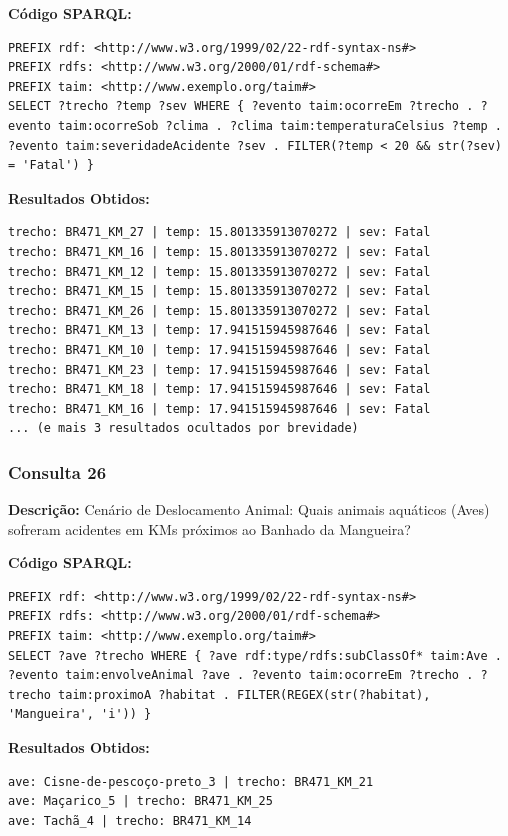\documentclass[12pt,a4paper]{article}
\begin{document}
\textbf{Código SPARQL:}
\begin{lstlisting}
PREFIX rdf: <http://www.w3.org/1999/02/22-rdf-syntax-ns#>
PREFIX rdfs: <http://www.w3.org/2000/01/rdf-schema#>
PREFIX taim: <http://www.exemplo.org/taim#>
SELECT ?trecho ?temp ?sev WHERE { ?evento taim:ocorreEm ?trecho . ?evento taim:ocorreSob ?clima . ?clima taim:temperaturaCelsius ?temp . ?evento taim:severidadeAcidente ?sev . FILTER(?temp < 20 && str(?sev) = 'Fatal') }
\end{lstlisting}

\textbf{Resultados Obtidos:}
\begin{lstlisting}
trecho: BR471_KM_27 | temp: 15.801335913070272 | sev: Fatal
trecho: BR471_KM_16 | temp: 15.801335913070272 | sev: Fatal
trecho: BR471_KM_12 | temp: 15.801335913070272 | sev: Fatal
trecho: BR471_KM_15 | temp: 15.801335913070272 | sev: Fatal
trecho: BR471_KM_26 | temp: 15.801335913070272 | sev: Fatal
trecho: BR471_KM_13 | temp: 17.941515945987646 | sev: Fatal
trecho: BR471_KM_10 | temp: 17.941515945987646 | sev: Fatal
trecho: BR471_KM_23 | temp: 17.941515945987646 | sev: Fatal
trecho: BR471_KM_18 | temp: 17.941515945987646 | sev: Fatal
trecho: BR471_KM_16 | temp: 17.941515945987646 | sev: Fatal
... (e mais 3 resultados ocultados por brevidade)
\end{lstlisting}

\vspace{1cm}
\subsubsection*{Consulta 26}

\textbf{Descrição:} Cenário de Deslocamento Animal: Quais animais aquáticos (Aves) sofreram acidentes em KMs próximos ao Banhado da Mangueira?

\textbf{Código SPARQL:}
\begin{lstlisting}
PREFIX rdf: <http://www.w3.org/1999/02/22-rdf-syntax-ns#>
PREFIX rdfs: <http://www.w3.org/2000/01/rdf-schema#>
PREFIX taim: <http://www.exemplo.org/taim#>
SELECT ?ave ?trecho WHERE { ?ave rdf:type/rdfs:subClassOf* taim:Ave . ?evento taim:envolveAnimal ?ave . ?evento taim:ocorreEm ?trecho . ?trecho taim:proximoA ?habitat . FILTER(REGEX(str(?habitat), 'Mangueira', 'i')) }
\end{lstlisting}

\textbf{Resultados Obtidos:}
\begin{lstlisting}
ave: Cisne-de-pescoço-preto_3 | trecho: BR471_KM_21
ave: Maçarico_5 | trecho: BR471_KM_25
ave: Tachã_4 | trecho: BR471_KM_14
\end{lstlisting}
\end{document}
